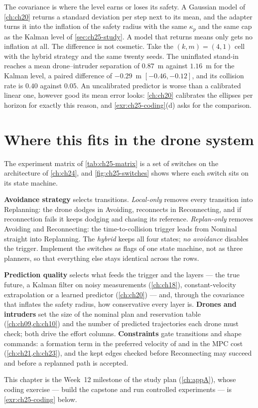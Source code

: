 The covariance is where the level earns or loses its safety. A Gaussian
model of \cref{ch:ch20} returns a standard deviation per step next to its
mean, and the adapter turns it into the inflation of the safety radius with
the same $\kappa_p$ and the same cap as the Kalman level of
\cref{sec:ch25-study}. A model that returns means only gets no inflation at
all. The difference is not cosmetic. Take the $(k, m) = (4, 1)$ cell with
the hybrid strategy and the same twenty seeds. The uninflated stand-in
reaches a mean drone--intruder separation of $0.87$~m against $1.16$~m for
the Kalman level, a paired difference of $-0.29$~m $[-0.46, -0.12]$, and its
collision rate is $0.40$ against $0.05$. An uncalibrated predictor is worse than a
calibrated linear one, however good its mean error looks:
\cref{ch:ch20} calibrates the ellipses per horizon for exactly this reason,
and \cref{exr:ch25-coding}(d) asks for the comparison.

\section{Where this fits in the drone system}
\label{sec:ch25-drone}

\begin{dronebox}
The experiment matrix of \cref{tab:ch25-matrix} is a set of switches on the
architecture of \cref{ch:ch24}, and \cref{fig:ch25-switches} shows where
each switch sits on its state machine.

\textbf{Avoidance strategy} selects transitions. \emph{Local-only} removes
every transition into Replanning: the drone dodges in Avoiding, reconnects
in Reconnecting, and if reconnection fails it keeps dodging and chasing its
reference. \emph{Replan-only} removes Avoiding and Reconnecting: the
time-to-collision trigger leads from Nominal straight into Replanning. The
\emph{hybrid} keeps all four states; \emph{no avoidance} disables the
trigger. Implement the switches as flags of one state machine, not as
three planners, so that everything else stays identical across the rows.

\textbf{Prediction quality} selects what feeds the trigger and the layers
--- the true future, a Kalman filter on noisy measurements
(\cref{ch:ch18}), constant-velocity extrapolation or a learned predictor
(\cref{ch:ch20}) --- and, through the covariance that inflates the safety
radius, how conservative every layer is. \textbf{Drones and intruders} set
the size of the nominal plan and reservation table (\cref{ch:ch09,ch:ch10})
and the number of predicted trajectories each drone must check; both drive
the effort columns. \textbf{Constraints} gate transitions and shape
commands: a formation term in the preferred velocity of \orca and in the
MPC cost (\cref{ch:ch21,ch:ch23}), and the kept edges checked before
Reconnecting may succeed and before a replanned path is accepted.

This chapter is the Week~12 milestone of the study plan (\cref{ch:appA}),
whose coding exercise --- build the capstone and run controlled experiments
--- is \cref{exr:ch25-coding} below.
\end{dronebox}


